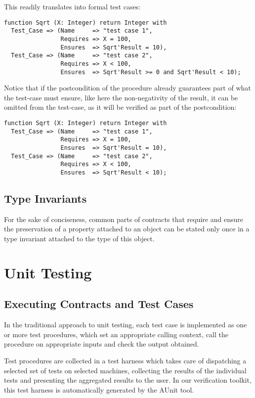 \documentclass{article}
\begin{document}
This readily translates into formal test cases:

\begin{verbatim}
function Sqrt (X: Integer) return Integer with
  Test_Case => (Name     => "test case 1",
                Requires => X = 100, 
                Ensures  => Sqrt'Result = 10),
  Test_Case => (Name     => "test case 2",
                Requires => X < 100, 
                Ensures  => Sqrt'Result >= 0 and Sqrt'Result < 10);
\end{verbatim}

Notice that if the postcondition of the procedure already guarantees part of
what the test-case must ensure, like here the non-negativity of the result, it
can be omitted from the test-case, as it will be verified as part of the
postcondition:

\begin{verbatim}
function Sqrt (X: Integer) return Integer with
  Test_Case => (Name     => "test case 1",
                Requires => X = 100, 
                Ensures  => Sqrt'Result = 10),
  Test_Case => (Name     => "test case 2",
                Requires => X < 100, 
                Ensures  => Sqrt'Result < 10);
\end{verbatim}

\subsection{Type Invariants}

For the sake of conciseness, common parts of contracts that require and ensure
the preservation of a property attached to an object can be stated only once in
a type invariant attached to the type of this object.

\section{Unit Testing}

\subsection{Executing Contracts and Test Cases}

In the traditional approach to unit testing, each test case is implemented as
one or more test procedures, which set an appropriate calling context, call the
procedure on appropriate inputs and check the output obtained.

Test procedures are collected in a test harness which takes care of dispatching
a selected set of tests on selected machines, collecting the results of the
individual tests and presenting the aggregated results to the user. In our
verification toolkit, this test harness is automatically generated by the AUnit
tool.
\end{document}
